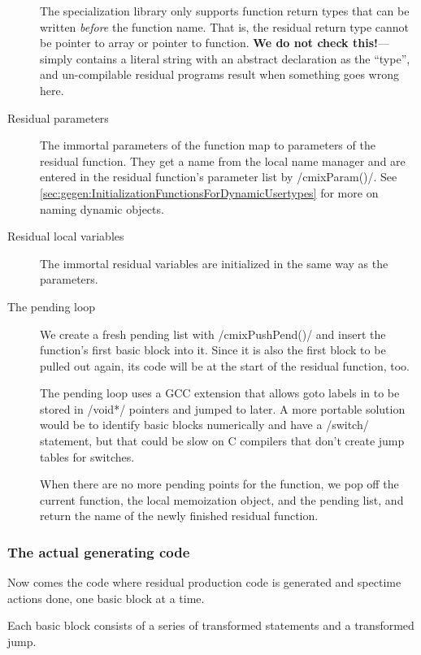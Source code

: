 \begin{docpart}
\begin{description}
	The specialization library only supports function return
	types that can be written \emph{before} the function name.
	That is, the residual return type cannot be pointer to array
	or pointer to function. \textbf{We do not check this!}---\Pgen{}
	simply contains a literal string with an abstract declaration
	as the ``type'', and un-compilable residual programs result
	when something goes wrong here.
\item[Residual parameters] The immortal parameters of the function
	map to parameters of the residual function. They get a name
	from the local name manager and are entered in the residual
	function's parameter list by /cmixParam()/. See 
	\ref{sec:gegen:InitializationFunctionsForDynamicUsertypes}
	for more on naming dynamic objects.
\item[Residual local variables] The immortal residual variables
	are initialized in the same way as the parameters.
\item[The pending loop] We create a fresh pending list with
	/cmixPushPend()/ and insert the function's first
	basic block into it. Since it is also the first block
	to be pulled out again, its code will be at the start
	of the residual function, too.

	The pending loop uses a GCC extension that allows goto
	labels in \Pgen{} to be stored in /void*/ pointers and
	jumped to later. A more portable solution would be
	to identify basic blocks numerically and have a /switch/
	statement, but that could be slow on C compilers that
	don't create jump tables for switches.

	When there are no more pending points for the function,
	we pop off the current function, the local memoization
	object, and the pending list, and return the name of
	the newly finished residual function.
\end{description}

\subsubsection{The actual generating code}
Now comes the code where residual production code is generated and
spectime actions done, one basic block at a time.

Each basic block consists of a series of transformed statements
and a transformed jump.


\end{docpart}

